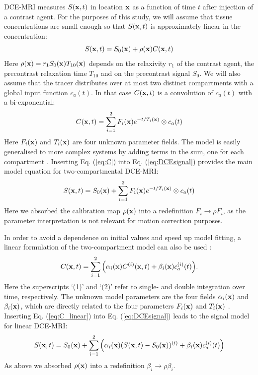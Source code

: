 \documentclass[num-refs]{wiley-article}
\newcommand{\x}{{\bf x}}
\newcommand{\ca}{c_a}
\begin{document}
DCE-MRI measures $S(\x, t)$ in location $\x$ as a function of time $t$ after injection of a contrast agent. For the purposes of this study, we will assume that tissue concentrations are small enough so that $S(\x, t)$ is approximately linear in the concentration:
\begin{equation}\label{eq:DCEsignal}
S(\x, t) = S_0(\x) + \rho(\x)C(\x, t)
\end{equation}
Here $\rho(\x) = r_1 S_0(\x)T_{10}(\x)$ depends on the relaxivity $r_1$ of the contrast agent, the precontrast relaxation time $T_{10}$ and on the precontrast signal $S_0$. We will also assume that the tracer distributes over at most two distinct compartments with a global input function $\ca(t)$. In that case $C(\x, t)$ is a convolution of $\ca(t)$ with a bi-exponential:
\begin{equation}
\label{eq:C}
C(\x, t)=\sum_{i=1}^2 F_i(\x)e^{-t/T_i(\x)} \otimes \ca(t)
\end{equation}
Here $F_i(\x)$ and $T_i(\x)$ are four unknown parameter fields. The model is easily generalised to more complex systems by adding terms in the sum, one for each compartment \cite{Sourbron2012, Jiao2014}. Inserting Eq. (\ref{eq:C}) into Eq. (\ref{eq:DCEsignal}) provides the main model equation for two-compartmental DCE-MRI:
\begin{equation}\label{eq:DCEmodel}
S(\x, t) 
= S_0(\x) + \sum_{i=1}^2 F_i(\x)e^{-t/T_i(\x)} \otimes \ca(t)
\end{equation}
Here we absorbed the calibration map $\rho(\x)$ into a redefinition $F_i\to\rho F_i$, as the parameter interpretation is not relevant for motion correction purposes. 

In order to avoid a dependence on initial values and speed up model fitting, a linear formulation of the two-compartment model can also be used \cite{Flouri2016}:
\begin{equation}
\label{eq:C_linear}
C(\x, t)=\sum_{i=1}^2 \Big( \alpha_i(\x) C^{(i)}(\x, t)+\beta_i(\x)\ca^{(i)} (t)\Big) .
\end{equation}
Here the superscripts `(1)' and `(2)' refer to single- and double integration over time, respectively. The unknown model parameters are the four fields $\alpha_i(\x)$ and $ \beta_i(\x)$, which are directly related to the four parameters $F_i(\x)$ and $T_i(\x)$ \cite{Flouri2016}. Inserting Eq. (\ref{eq:C_linear}) into Eq. (\ref{eq:DCEsignal}) leads to the signal model for linear DCE-MRI:
\begin{eqnarray}
\label{eq:DCEmodel_linear}
S(\x, t) = 
S_0(\x) + \sum^2_{i=1}  \Big(\alpha_i(\x) (S(\x, t) - S_0(\x))^{(i)}+\beta_i(\x) \ca^{(i)}(t)\Big)
\end{eqnarray}
As above we absorbed $\rho(\x)$ into a redefinition $\beta_i\to\rho\beta_i$. 
\end{document}
